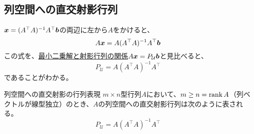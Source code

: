 \documentclass[../../../topic_linear-algebra]{subfiles}
\begin{document}
\subsection{列空間への直交射影行列}

$\vb*{x} = (A^\top A)^{-1}A^\top \vb*{b}$の両辺に左から$A$をかけると、
\begin{equation*}
  A\vb*{x} = A(A^\top A)^{-1}A^\top \vb*{b}
\end{equation*}
この式を、\hyperref[thm:least-squares-projection]{最小二乗解と射影行列の関係}$A\vb*{x} = P_{\mathcal{U}}\vb*{b}$と見比べると、
\begin{equation*}
  P_{\mathcal{U}} = A(A^\top A)^{-1}A^\top
\end{equation*}
であることがわかる。

\begin{theorem}{列空間への直交射影の行列表現}\label{thm:projection-matrix-colspace}
  $m \times n$型行列$A$において、$m \geq n = \rank A$（列ベクトルが線型独立）のとき、$A$の列空間への直交射影行列は次のように表される。
  \begin{equation*}
    P_{\mathcal{U}} = A(A^\top A)^{-1}A^\top
  \end{equation*}
\end{theorem}
\end{document}
